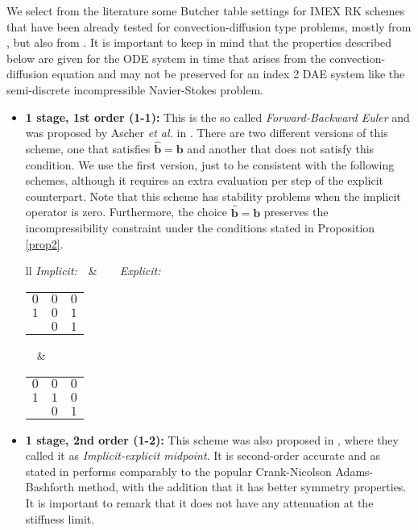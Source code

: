 We select from the literature some Butcher table settings for IMEX RK schemes that have been already tested for convection-diffusion type problems, mostly from \cite{ascher_implicit-explicit_1997}, but also from \cite{boscarino_accurate_2009}. It is important to keep in mind that the properties described below are given for the ODE system in time that arises from the convection-diffusion equation and may not be preserved for an index 2 DAE system like the semi-discrete incompressible Navier-Stokes problem.
\begin{itemize}
\item \textbf{1 stage, 1st order (1-1):}
This is the so called \textit{Forward-Backward Euler} and was proposed by Ascher \emph{et al.} in \cite{ascher_implicit-explicit_1997}. There are two different versions of this scheme, one that satisfies $\hat{\mathbf{b}}=\mathbf{b}$ and another that does not satisfy this condition. We use the first version, just to be consistent with the following schemes, although it requires an extra evaluation per step of the explicit counterpart. Note that this scheme has stability problems when the implicit operator is zero. Furthermore, the choice $\hat{\mathbf{b}}=\mathbf{b}$ preserves the incompressibility constraint under the conditions stated in Proposition \ref{prop2}.
\begin{center}
\begin{tabular}{ll}
\textit{Implicit:}$\quad$&$\quad\quad$\textit{Explicit:}\\
\begin{tabular}{c|cc}
$0$&$0$&$0$\\
$1$&$0$&$1$\\
\hline
&$0$&$1$
\end{tabular}$\quad$&
$\quad\quad$\begin{tabular}{c|cc}
$0$&$0$&$0$\\
$1$&$1$&$0$\\
\hline
&$0$&$1$
\end{tabular}
\end{tabular}
\end{center}
\item \textbf{1 stage, 2nd order (1-2):}
This scheme was also proposed in \cite{ascher_implicit-explicit_1997}, where they called it as \textit{Implicit-explicit midpoint}. It is second-order accurate and as stated in \cite{ascher_implicit-explicit_1997} performs comparably to the popular Crank-Nicolson Adams-Bashforth method, with the addition that it has better symmetry properties. It is important to remark that it does not have any attenuation at the stiffness limit.

\end{itemize}
